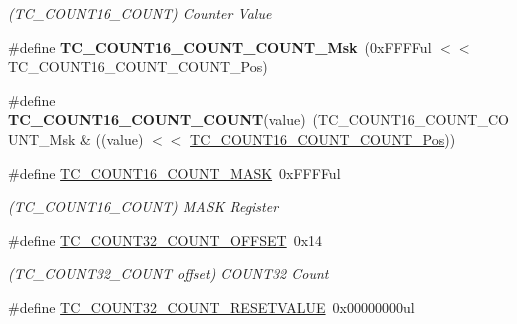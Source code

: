 \begin{DoxyCompactItemize}
\begin{DoxyCompactList}\small\item\em (T\+C\+\_\+\+C\+O\+U\+N\+T16\+\_\+\+C\+O\+U\+N\+T) Counter Value \end{DoxyCompactList}\item 
\hypertarget{group___s_a_m_l21___t_c_ga8c33458bc719e32a070730d2fa3d3225}{}\#define {\bfseries T\+C\+\_\+\+C\+O\+U\+N\+T16\+\_\+\+C\+O\+U\+N\+T\+\_\+\+C\+O\+U\+N\+T\+\_\+\+Msk}~(0x\+F\+F\+F\+Ful $<$$<$ T\+C\+\_\+\+C\+O\+U\+N\+T16\+\_\+\+C\+O\+U\+N\+T\+\_\+\+C\+O\+U\+N\+T\+\_\+\+Pos)\label{group___s_a_m_l21___t_c_ga8c33458bc719e32a070730d2fa3d3225}

\item 
\hypertarget{group___s_a_m_l21___t_c_gade6c99c93ea5c7a9a55fda14e5b8fcf1}{}\#define {\bfseries T\+C\+\_\+\+C\+O\+U\+N\+T16\+\_\+\+C\+O\+U\+N\+T\+\_\+\+C\+O\+U\+N\+T}(value)~(T\+C\+\_\+\+C\+O\+U\+N\+T16\+\_\+\+C\+O\+U\+N\+T\+\_\+\+C\+O\+U\+N\+T\+\_\+\+Msk \& ((value) $<$$<$ \hyperlink{group___s_a_m_l21___t_c_ga1f543bea0390de24abbf37a20d449098}{T\+C\+\_\+\+C\+O\+U\+N\+T16\+\_\+\+C\+O\+U\+N\+T\+\_\+\+C\+O\+U\+N\+T\+\_\+\+Pos}))\label{group___s_a_m_l21___t_c_gade6c99c93ea5c7a9a55fda14e5b8fcf1}

\item 
\hypertarget{group___s_a_m_l21___t_c_gafb23c172f6c00f6f65bbc0fadd126f8e}{}\#define \hyperlink{group___s_a_m_l21___t_c_gafb23c172f6c00f6f65bbc0fadd126f8e}{T\+C\+\_\+\+C\+O\+U\+N\+T16\+\_\+\+C\+O\+U\+N\+T\+\_\+\+M\+A\+S\+K}~0x\+F\+F\+F\+Ful\label{group___s_a_m_l21___t_c_gafb23c172f6c00f6f65bbc0fadd126f8e}

\begin{DoxyCompactList}\small\item\em (T\+C\+\_\+\+C\+O\+U\+N\+T16\+\_\+\+C\+O\+U\+N\+T) M\+A\+S\+K Register \end{DoxyCompactList}\item 
\hypertarget{group___s_a_m_l21___t_c_ga61a1866557d1d327aa3573ae318b284a}{}\#define \hyperlink{group___s_a_m_l21___t_c_ga61a1866557d1d327aa3573ae318b284a}{T\+C\+\_\+\+C\+O\+U\+N\+T32\+\_\+\+C\+O\+U\+N\+T\+\_\+\+O\+F\+F\+S\+E\+T}~0x14\label{group___s_a_m_l21___t_c_ga61a1866557d1d327aa3573ae318b284a}

\begin{DoxyCompactList}\small\item\em (T\+C\+\_\+\+C\+O\+U\+N\+T32\+\_\+\+C\+O\+U\+N\+T offset) C\+O\+U\+N\+T32 Count \end{DoxyCompactList}\item 
\hypertarget{group___s_a_m_l21___t_c_ga6f49bd32758ce74d3638e3d37b1bfeab}{}\#define \hyperlink{group___s_a_m_l21___t_c_ga6f49bd32758ce74d3638e3d37b1bfeab}{T\+C\+\_\+\+C\+O\+U\+N\+T32\+\_\+\+C\+O\+U\+N\+T\+\_\+\+R\+E\+S\+E\+T\+V\+A\+L\+U\+E}~0x00000000ul\label{group___s_a_m_l21___t_c_ga6f49bd32758ce74d3638e3d37b1bfeab}


\end{DoxyCompactItemize}
